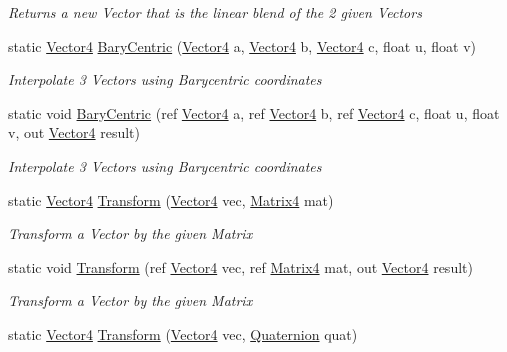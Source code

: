 \begin{DoxyCompactItemize}
\begin{DoxyCompactList}\small\item\em Returns a new Vector that is the linear blend of the 2 given Vectors \end{DoxyCompactList}\item 
static \hyperlink{struct_open_t_k_1_1_vector4}{Vector4} \hyperlink{struct_open_t_k_1_1_vector4_a587b8187b4e73c9d488fc48b933f9f36}{Bary\-Centric} (\hyperlink{struct_open_t_k_1_1_vector4}{Vector4} a, \hyperlink{struct_open_t_k_1_1_vector4}{Vector4} b, \hyperlink{struct_open_t_k_1_1_vector4}{Vector4} c, float u, float v)
\begin{DoxyCompactList}\small\item\em Interpolate 3 Vectors using Barycentric coordinates \end{DoxyCompactList}\item 
static void \hyperlink{struct_open_t_k_1_1_vector4_ae5a725fa4d4a2fac650f163c8c74c289}{Bary\-Centric} (ref \hyperlink{struct_open_t_k_1_1_vector4}{Vector4} a, ref \hyperlink{struct_open_t_k_1_1_vector4}{Vector4} b, ref \hyperlink{struct_open_t_k_1_1_vector4}{Vector4} c, float u, float v, out \hyperlink{struct_open_t_k_1_1_vector4}{Vector4} result)
\begin{DoxyCompactList}\small\item\em Interpolate 3 Vectors using Barycentric coordinates\end{DoxyCompactList}\item 
static \hyperlink{struct_open_t_k_1_1_vector4}{Vector4} \hyperlink{struct_open_t_k_1_1_vector4_a4cf20f2b1edc60a283ea4ceefd33654d}{Transform} (\hyperlink{struct_open_t_k_1_1_vector4}{Vector4} vec, \hyperlink{struct_open_t_k_1_1_matrix4}{Matrix4} mat)
\begin{DoxyCompactList}\small\item\em Transform a Vector by the given Matrix\end{DoxyCompactList}\item 
static void \hyperlink{struct_open_t_k_1_1_vector4_a7924b990904d2933269e9139f00f581c}{Transform} (ref \hyperlink{struct_open_t_k_1_1_vector4}{Vector4} vec, ref \hyperlink{struct_open_t_k_1_1_matrix4}{Matrix4} mat, out \hyperlink{struct_open_t_k_1_1_vector4}{Vector4} result)
\begin{DoxyCompactList}\small\item\em Transform a Vector by the given Matrix\end{DoxyCompactList}\item 
static \hyperlink{struct_open_t_k_1_1_vector4}{Vector4} \hyperlink{struct_open_t_k_1_1_vector4_a38db62497f185ccd287de7bf0bca21f0}{Transform} (\hyperlink{struct_open_t_k_1_1_vector4}{Vector4} vec, \hyperlink{struct_open_t_k_1_1_quaternion}{Quaternion} quat)

\end{DoxyCompactItemize}
